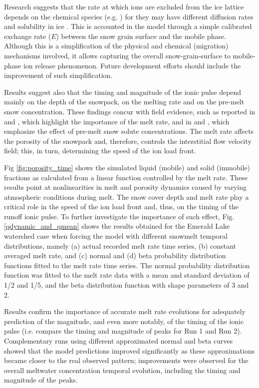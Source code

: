 \documentclass[authoryear,preprint,review,12pt]{elsarticle}
\begin{document}
Research suggests that the rate at which ions are excluded from the ice lattice depends on the chemical species (e.g. \citet{Pomeroy2005}) for they may have different diffusion rates and solubility in ice \citep{Harrington1998}. This is accounted in the model through a simple calibrated exchange rate ($E$) between the snow grain surface and the mobile phase. Although this is a simplification of the physical and chemical (migration) mechanisms involved, it allows capturing the overall snow-grain-surface to mobile-phase ion release phenomenon. Future development efforts should include the improvement of such simplification. \par

Results suggest also that the timing and magnitude of the ionic pulse depend mainly on the depth of the snowpack, on the melting rate and on the pre-melt snow concentration. These findings concur with field evidence, such as reported in \citet{Colbeck1981} and \citet{Marsh1993}, which highlight the importance of the melt rate, and in \citet{Brimblecombe1987} and \citet{Domine1995}, which emphasize the effect of pre-melt snow solute concentrations. The melt rate affects the porosity of the snowpack and, therefore, controls the interstitial flow velocity field; this, in turn, determining the speed of the ion load front. 

Fig \ref{fig:porosity_time} shows the simulated liquid (mobile) and solid (immobile) fractions as calculated from a linear function controlled by the melt rate. These results point at nonlinearities in melt and porosity dynamics caused by varying atmospheric conditions during melt. The snow cover depth and melt rate play a critical role in the speed of the ion load front and, thus, on the timing of the runoff ionic pulse. To further investigate the importance of such effect, Fig. \ref{qdynamic_and_qmean} shows the results obtained for the Emerald Lake watershed case when forcing the model with different snowmelt temporal distributions, namely (a) actual recorded melt rate time series, (b) constant averaged melt rate, and (c) normal and (d) beta probability distribution functions fitted to the melt rate time series. The normal probability distribution function was fitted to the melt rate data with a mean and standard deviation of 1/2 and 1/5, and the beta distribution function with shape parameters of 3 and 2.

Results confirm the importance of accurate melt rate evolutions for adequately prediction of the magnitude, and even more notably, of the timing of the ionic pulse (i.e. compare the timing and magnitude of peaks for Run 1 and Run 2). Complementary runs using different approximated normal and beta curves showed that the model predictions improved significantly as these approximations became closer to the real observed pattern; improvements were observed for the overall meltwater concentration temporal evolution, including the timing and magnitude of the peaks.
\end{document}

